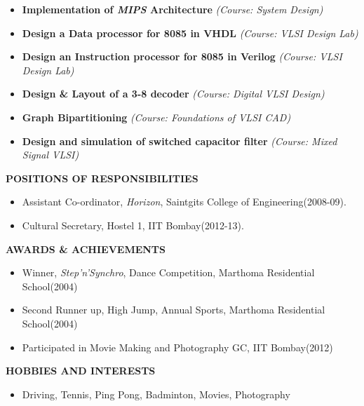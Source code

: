 \documentclass[a4paper,10pt]{article}
\begin{document}
 \begin{itemize}
  \setlength{\itemsep}{1pt}
  \item \textbf{{Implementation of \textit{MIPS} Architecture}} \textit{(Course: System Design)}
  \item \textbf{{Design a Data processor for 8085 in VHDL}} \textit{(Course: VLSI Design Lab)}
  \item \textbf{{Design an Instruction processor for 8085 in Verilog}} \textit{(Course: VLSI Design Lab)}
  \item \textbf{{Design \& Layout of a 3-8 decoder}}   \textit{(Course: Digital VLSI Design)}
  \item \textbf{{Graph Bipartitioning}} \textit{(Course: Foundations of VLSI CAD)}
  \item \textbf{{Design and simulation of switched capacitor filter}} \textit{(Course: Mixed Signal VLSI)}
 \end{itemize}
 

 \colorbox{titleColor}{\parbox{6.5in}{\textbf{POSITIONS OF RESPONSIBILITIES}}}
   \begin{itemize}
    \item Assistant Co-ordinator, \textit{Horizon}, Saintgits College of Engineering(2008-09).
    \item Cultural Secretary, Hostel 1, IIT Bombay(2012-13). %
  \end{itemize}  
 \colorbox{titleColor}{\parbox{6.5in}{\textbf{AWARDS \& ACHIEVEMENTS}}}
  \begin{itemize}
  \item Winner, \textit{Step'n'Synchro}, Dance Competition, Marthoma Residential School(2004)
  \item Second Runner up, High Jump, Annual Sports,  Marthoma Residential School(2004)
  \item Participated in Movie Making and Photography GC, IIT Bombay(2012) 
  \end{itemize} 
 \colorbox{titleColor}{\parbox{6.5in}{\textbf{HOBBIES AND INTERESTS}}}
  \begin{itemize}
   \item Driving, Tennis, Ping Pong, Badminton, Movies, Photography
  \end{itemize}
\end{document}
